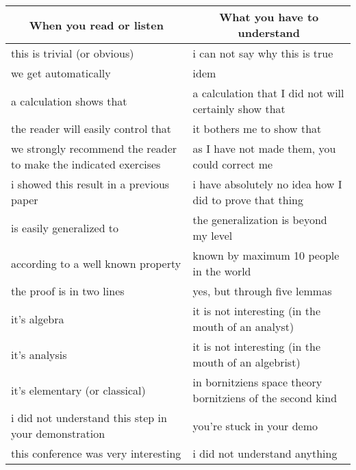 	\begin{table}[H]
	\begin{center}
			\begin{tabular}{|p{7.5cm}|p{7.5cm}|}
				\hline
				\multicolumn{1}{c}{\cellcolor{black!30}\textbf{When you read or listen}} & 
  \multicolumn{1}{c}{\cellcolor{black!30}\textbf{What you have to understand}} \\ \hline
				this is trivial (or obvious) & i can not say why this is true \\ \hline
				we get automatically & idem \\ \hline
				a calculation shows that & a calculation that I did not will certainly show that\\ \hline
				the reader will easily control that & it bothers me to show that\\ \hline
				we strongly recommend the reader to make the indicated exercises & as I have not made them, you could correct me\\ \hline
				i showed this result in a previous paper & i have absolutely no idea how I did to prove that thing			
				\\ \hline
				is easily generalized to & the generalization is beyond my level			
				\\ \hline
				according to a well known property & known by maximum 10 people in the world
				\\ \hline
				the proof is in two lines & yes, but through five lemmas
				\\ \hline
				it's algebra & it is not interesting (in the mouth of an analyst)
				\\ \hline
				it's analysis & it is not interesting (in the mouth of an algebrist)
				\\ \hline
				it's elementary (or classical) & in bornitziens space theory bornitziens of the second kind
				\\ \hline
				i did not understand this step in your demonstration & you're stuck in your demo
				\\ \hline
				this conference was very interesting & i did not understand anything
				\\ \hline
		\end{tabular}
	\end{center}
	\end{table}	
	\begin{center}\underline{\hspace{5 cm}}\end{center}
	
